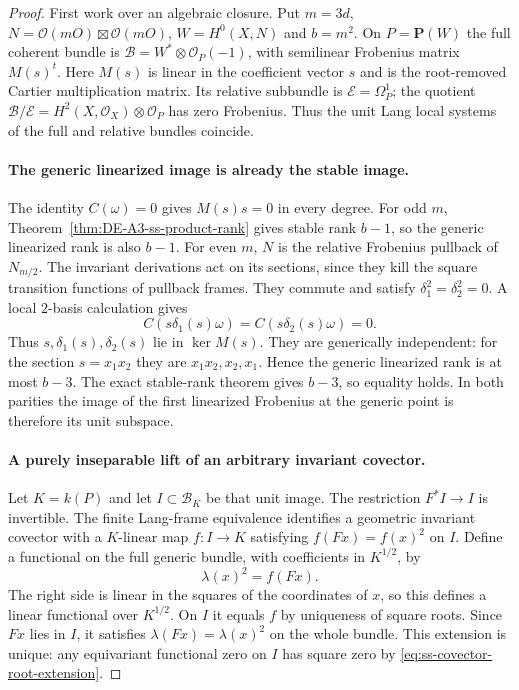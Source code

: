 \begin{proof}
First work over an algebraic closure. Put $m=3d$,
$N=\mathcal O(mO)\boxtimes\mathcal O(mO)$,
$W=H^0(X,N)$ and $b=m^2$. On $P=\mathbf P(W)$ the full coherent
bundle is $\mathcal B=W^*\otimes\mathcal O_P(-1)$, with semilinear
Frobenius matrix $M(s)^t$. Here $M(s)$ is linear in the coefficient
vector $s$ and is the root-removed Cartier multiplication matrix.
Its relative subbundle is $\mathcal E=\Omega_P^1$; the quotient
$\mathcal B/\mathcal E=H^2(X,\mathcal O_X)\otimes\mathcal O_P$
has zero Frobenius. Thus the unit Lang local systems of the full
and relative bundles coincide.

\paragraph{The generic linearized image is already the stable image.}
The identity $C(\omega)=0$ gives $M(s)s=0$ in every degree.
For odd $m$, Theorem~\ref{thm:DE-A3-ss-product-rank} gives stable
rank $b-1$, so the generic linearized rank is also $b-1$.
For even $m$, $N$ is the relative Frobenius pullback of $N_{m/2}$.
The invariant derivations act on its sections, since they kill the
square transition functions of pullback frames. They commute and
satisfy $\delta_1^2=\delta_2^2=0$. A local $2$-basis calculation gives
\[
 C(s\delta_1(s)\omega)=C(s\delta_2(s)\omega)=0.
\]
Thus $s,\delta_1(s),\delta_2(s)$ lie in $\ker M(s)$.
They are generically independent: for the section $s=x_1x_2$
they are $x_1x_2,x_2,x_1$. Hence the generic linearized rank is
at most $b-3$. The exact stable-rank theorem gives $b-3$, so
equality holds. In both parities the image of the first linearized
Frobenius at the generic point is therefore its unit subspace.

\paragraph{A purely inseparable lift of an arbitrary invariant covector.}
Let $K=k(P)$ and let $I\subset\mathcal B_K$ be that unit image.
The restriction $F^*I\to I$ is invertible. The finite Lang-frame
equivalence identifies a geometric invariant covector with a
$K$-linear map $f:I\to K$ satisfying
$f(Fx)=f(x)^2$ on $I$. Define a functional on the full generic
bundle, with coefficients in $K^{1/2}$, by
\begin{equation}\label{eq:ss-covector-root-extension}
                  \lambda(x)^2=f(Fx).
\end{equation}
The right side is linear in the squares of the coordinates of $x$,
so this defines a linear functional over $K^{1/2}$. On $I$ it
equals $f$ by uniqueness of square roots. Since $Fx$ lies in $I$,
it satisfies $\lambda(Fx)=\lambda(x)^2$ on the whole bundle.
This extension is unique: any equivariant functional zero on $I$
has square zero by \eqref{eq:ss-covector-root-extension}.


\end{proof}
